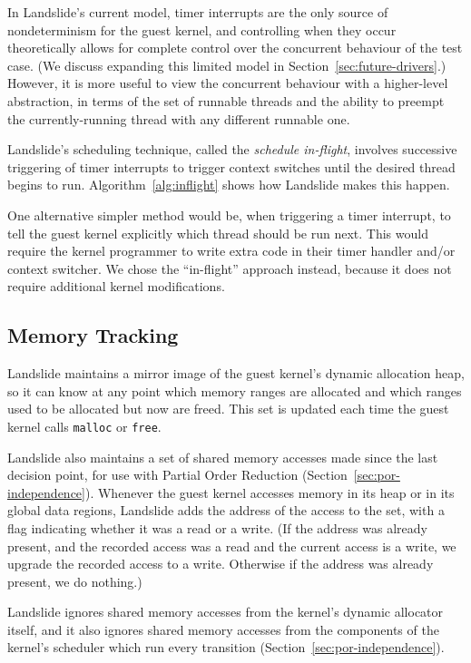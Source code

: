 In Landslide's current model, timer interrupts are the only source of nondeterminism for the guest kernel, and controlling when they occur theoretically allows for complete control over the concurrent behaviour of the test case. (We discuss expanding this limited model in Section~\ref{sec:future-drivers}.) However, it is more useful to view the concurrent behaviour with a higher-level abstraction, in terms of the set of runnable threads and the ability to preempt the currently-running thread with any different runnable one.

Landslide's scheduling technique, called the {\em schedule in-flight}, involves successive triggering of timer interrupts to trigger context switches until the desired thread begins to run. Algorithm~\ref{alg:inflight} shows how Landslide makes this happen.

One alternative simpler method would be, when triggering a timer interrupt, to tell the guest kernel explicitly which thread should be run next. This would require the kernel programmer to write extra code in their timer handler and/or context switcher. We chose the ``in-flight'' approach instead, because it does not require additional kernel modifications.

\subsection{Memory Tracking}
\label{sec:components-memory}

Landslide maintains a mirror image of the guest kernel's dynamic allocation heap, so it can know at any point which memory ranges are allocated and which ranges used to be allocated but now are freed. This set is updated each time the guest kernel calls \texttt{malloc} or \texttt{free}.

Landslide also maintains a set of shared memory accesses made since the last decision point, for use with Partial Order Reduction (Section~\ref{sec:por-independence}). Whenever the guest kernel accesses memory in its heap or in its global data regions, Landslide adds the address of the access to the set, with a flag indicating whether it was a read or a write. (If the address was already present, and the recorded access was a read and the current access is a write, we upgrade the recorded access to a write. Otherwise if the address was already present, we do nothing.)

Landslide ignores shared memory accesses from the kernel's dynamic allocator itself, and it also ignores shared memory accesses from the components of the kernel's scheduler which run every transition (Section~\ref{sec:por-independence}).

